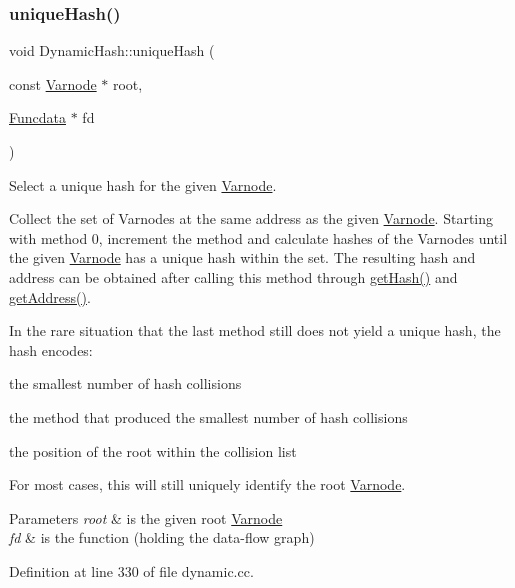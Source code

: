 \subsubsection{\texorpdfstring{uniqueHash()}{uniqueHash()}}
{\footnotesize\ttfamily void Dynamic\+Hash\+::unique\+Hash (\begin{DoxyParamCaption}\item[{const \mbox{\hyperlink{class_varnode}{Varnode}} $\ast$}]{root,  }\item[{\mbox{\hyperlink{class_funcdata}{Funcdata}} $\ast$}]{fd }\end{DoxyParamCaption})}



Select a unique hash for the given \mbox{\hyperlink{class_varnode}{Varnode}}. 

Collect the set of Varnodes at the same address as the given \mbox{\hyperlink{class_varnode}{Varnode}}. Starting with method 0, increment the method and calculate hashes of the Varnodes until the given \mbox{\hyperlink{class_varnode}{Varnode}} has a unique hash within the set. The resulting hash and address can be obtained after calling this method through \mbox{\hyperlink{class_dynamic_hash_ae25a2b1eca6a505bcb4e97b67eb1b2e7}{get\+Hash()}} and \mbox{\hyperlink{class_dynamic_hash_a304ee882e7ad7f4edd33bda810622cb2}{get\+Address()}}.

In the rare situation that the last method still does not yield a unique hash, the hash encodes\+:
\begin{DoxyItemize}
\item the smallest number of hash collisions
\item the method that produced the smallest number of hash collisions
\item the position of the root within the collision list
\end{DoxyItemize}

For most cases, this will still uniquely identify the root \mbox{\hyperlink{class_varnode}{Varnode}}. 
\begin{DoxyParams}{Parameters}
{\em root} & is the given root \mbox{\hyperlink{class_varnode}{Varnode}} \\
\hline
{\em fd} & is the function (holding the data-\/flow graph) \\
\hline
\end{DoxyParams}


Definition at line 330 of file dynamic.\+cc.

